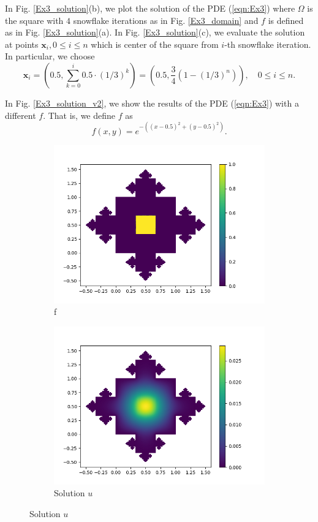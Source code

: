 \documentclass[12pt]{article}%
\theoremstyle{plain}
\numberwithin{equation}{section}
\begin{document}
 In Fig. \ref{Ex3_solution}(b), we plot the solution of the PDE (\ref{eqn:Ex3}) where $\Omega$ is the square with $4$ snowflake iterations as in Fig. \ref{Ex3_domain} and $f$ is defined as in  Fig. \ref{Ex3_solution}(a). In Fig. \ref{Ex3_solution}(c), we evaluate the solution at points $\textbf{x}_i,0\leq i\leq n$ which is center of the square from $i$-th snowflake iteration. In particular, we choose 
 $$
 \textbf{x}_i=(0.5, \sum_{k=0}^i0.5\cdot(1/3)^k)=(0.5,\frac{3}{4}(1-(1/3)^n)),\quad 0\leq i\leq n.
 $$
 
 In Fig. \ref{Ex3_solution_v2}, we show the results of the PDE (\ref{eqn:Ex3}) with a different $f$. That is, we define $f$ as 
 $$
 f(x,y)=e^{-((x-0.5)^2+(y-0.5)^2)}.
 $$
  \begin{figure}[H]%
    \centering
         \begin{subfigure}[h]{0.45\linewidth}
         \caption{f}
\includegraphics[width=\linewidth]{figures/Ex3/Ex3_f.png}
\end{subfigure}
 \begin{subfigure}[h]{0.45\linewidth}
         \caption{Solution $u$}
\includegraphics[width=\linewidth]{figures/Ex3/Ex3_solution.png}

\end{subfigure}
\end{figure}
\end{document}

